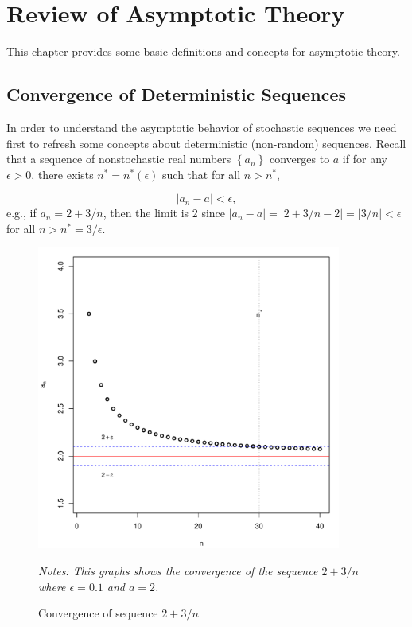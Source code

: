 \chapter{Review of Asymptotic Theory}

This chapter provides some basic definitions and concepts for asymptotic theory. 

\section{Convergence of Deterministic Sequences}\label{sec:nonstochastic_con}

In order to understand the asymptotic behavior of stochastic sequences we need first to refresh some concepts about deterministic (non-random) sequences. Recall that a sequence of nonstochastic real numbers $\left\lbrace a_n\right\rbrace$ converges to $a$ if for any $\epsilon > 0$, there exists $n^* = n^*(\epsilon)$ such that for all $n > n^*$,

\begin{equation*}
	\left| a_n - a\right|<\epsilon, 
\end{equation*}
%
e.g., if $a_n = 2 + 3/n$, then the limit is 2 since $\left| a_n - a\right| =\left| 2 + 3/n - 2\right| = \left|3/n\right|< \epsilon$ for all $n > n^* = 3/\epsilon$. 


\begin{figure}[ht]
  \caption{Convergence of sequence $2 + 3/n$}
    \label{fig:SeqConv}
    \centering
    \begin{minipage}{.9\linewidth}
\begin{knitrout}
\color{fgcolor}

{\centering \includegraphics[width=10cm,height=10cm]{figure/SeqConv-1} 

}


\end{knitrout}
\footnotesize
		\emph{Notes: This graphs shows the convergence of the sequence $2 + 3/n$ where $\epsilon = 0.1$ and $a = 2$.}
	\end{minipage}
\end{figure}


